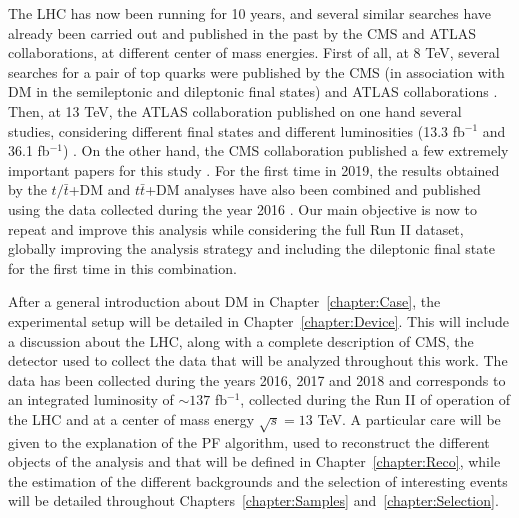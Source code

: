 \documentclass[a4paper, 10pt, openright]{report}
\begin{document}
The \ac{LHC} has now been running for 10 years, and several similar searches have already been carried out and published in the past by the \ac{CMS} and \ac{ATLAS} collaborations, at different center of mass energies. First of all, at 8 TeV, several searches for a pair of top quarks were published by the \ac{CMS} (in association with \ac{DM} in the semileptonic \cite{PreviousDoubleTopSingleLep8CMS} and dileptonic \cite{PreviousDoubleTopDiLep8CMS} final states) and \ac{ATLAS} collaborations \cite{PreviousDoubleTopAllLep8ATLAS}. Then, at 13 TeV, the \ac{ATLAS} collaboration published on one hand several studies, considering different final states and different luminosities (13.3 fb$^{-1}$ and 36.1 fb$^{-1}$) \cite{PreviousDoubleTopNoLep13ATLAS, PreviousDoubleTopOneLep13ATLAS, PreviousDoubleTopDiLep13ATLAS}. On the other hand, the \ac{CMS} collaboration published a few extremely important papers for this study \cite{PreviousDoubleTopBottomAllLep13CMS, PreviousDoubleTopAllLep13CMS}. For the first time in 2019, the results obtained by the $t/\bar t$+DM and $t \bar t$+DM analyses have also been combined and published using the data collected during the year 2016 \cite{PreviousSingleDoubleTopAllLep13CMS}. Our main objective is now to repeat and improve this analysis while considering the full Run II dataset, globally improving the analysis strategy and including the dileptonic final state for the first time in this combination.

\newpage

After a general introduction about \ac{DM} in Chapter~\ref{chapter:Case}, the experimental setup will be detailed in Chapter~\ref{chapter:Device}. This will include a discussion about the \ac{LHC}, along with a complete description of \ac{CMS}, the detector used to collect the data that will be analyzed throughout this work. The data has been collected during the years 2016, 2017 and 2018 and corresponds to an integrated luminosity of $\sim 137$ fb$^{-1}$, collected during the Run II of operation of the \ac{LHC} and at a center of mass energy $\sqrt{s} = 13$ TeV. A particular care will be given to the explanation of the \acf{PF} algorithm, used to reconstruct the different objects of the analysis and that will be defined in Chapter~\ref{chapter:Reco}, while the estimation of the different backgrounds and the selection of interesting events will be detailed throughout Chapters~\ref{chapter:Samples} and~\ref{chapter:Selection}.
\end{document}
